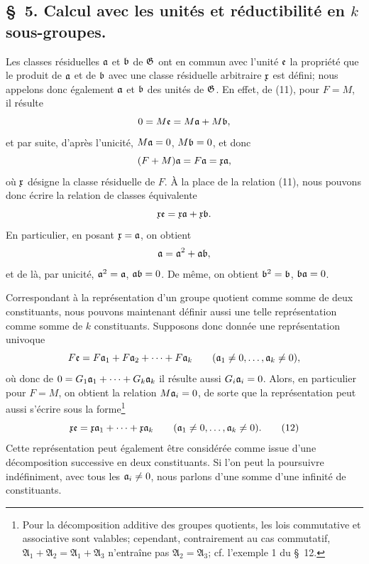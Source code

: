 \subsection*{\S~5. Calcul avec les unités et réductibilité en $k$ sous-groupes.}

Les classes résiduelles $\mathfrak{a}$ et $\mathfrak{b}$ de $\mathfrak{G}$ ont en commun avec l'unité $\mathfrak{e}$ la propriété que le produit de $\mathfrak{a}$ et de $\mathfrak{b}$ avec une classe résiduelle arbitraire $\mathfrak{x}$ est défini; nous appelons donc également $\mathfrak{a}$ et $\mathfrak{b}$ des unités de $\mathfrak{G}$. En effet, de (11), pour $F=M$, il résulte
\[
 0=M\mathfrak{e}=M\mathfrak{a}+M\mathfrak{b},
\]
et par suite, d'après l'unicité, $M\mathfrak{a}=0$, $M\mathfrak{b}=0$, et donc
\[
 (F+M)\mathfrak{a}=F\mathfrak{a}=\mathfrak{x}\mathfrak{a},
\]
où $\mathfrak{x}$ désigne la classe résiduelle de $F$. À la place de la relation (11), nous pouvons donc écrire la relation de classes équivalente
\[
 \mathfrak{x}\mathfrak{e}=\mathfrak{x}\mathfrak{a}+\mathfrak{x}\mathfrak{b}.
\]
En particulier, en posant $\mathfrak{x}=\mathfrak{a}$, on obtient
\[
 \mathfrak{a}=\mathfrak{a}^2+\mathfrak{a}\mathfrak{b},
\]
et de là, par unicité, $\mathfrak{a}^2=\mathfrak{a}$, $\mathfrak{a}\mathfrak{b}=0$. De même, on obtient $\mathfrak{b}^2=\mathfrak{b}$, $\mathfrak{b}\mathfrak{a}=0$.

Correspondant à la représentation d'un groupe quotient comme somme de deux constituants, nous pouvons maintenant définir aussi une telle représentation comme somme de $k$ constituants. Supposons donc donnée une représentation univoque
\[
 F\mathfrak{e}=F\mathfrak{a}_1+F\mathfrak{a}_2+\cdots+F\mathfrak{a}_k\qquad(\mathfrak{a}_1\ne0,\ldots,\mathfrak{a}_k\ne0),
\]
où donc de $0=G_1\mathfrak{a}_1+\cdots+G_k\mathfrak{a}_k$ il résulte aussi $G_i\mathfrak{a}_i=0$. Alors, en particulier pour $F=M$, on obtient la relation $M\mathfrak{a}_i=0$, de sorte que la représentation peut aussi s'écrire sous la forme\footnote{Pour la décomposition additive des groupes quotients, les lois commutative et associative sont valables; cependant, contrairement au cas commutatif, $\mathfrak A_1+\mathfrak A_2=\mathfrak A_1+\mathfrak A_3$ n'entraîne pas $\mathfrak A_2=\mathfrak A_3$; cf. l'exemple 1 du \S~12.}
\begin{equation}
 \mathfrak{x}\mathfrak{e}=\mathfrak{x}\mathfrak{a}_1+\cdots+\mathfrak{x}\mathfrak{a}_k\qquad(\mathfrak{a}_1\ne0,\ldots,\mathfrak{a}_k\ne0).
\tag{12}
\end{equation}
Cette représentation peut également être considérée comme issue d'une décomposition successive en deux constituants. Si l'on peut la poursuivre indéfiniment, avec tous les $\mathfrak{a}_i\ne0$, nous parlons d'une somme d'une infinité de constituants.

